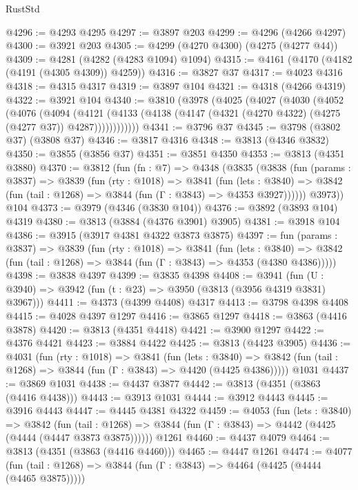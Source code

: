 \begin{lexlean}{RustStd}
\begin{coremodule}
{\begin{coremodule}
{{{{{{{{{{{{{{{{{{{{{{{{{{{{{{{{{{{@4296 := @4293 @4295
@4297 := @3897 @203
@4299 := @4296 (@4266 @4297)
@4300 := @3921 @203
@4305 := @4299 (@4270 @4300) (@4275 (@4277 @44))
@4309 := @4281 (@4282 (@4283 @1094) @1094)
@4315 := @4161 (@4170 (@4182 (@4191 (@4305 @4309)) @4259))
@4316 := @3827 @37
@4317 := @4023 @4316
@4318 := @4315 @4317
@4319 := @3897 @104
@4321 := @4318 (@4266 @4319)
@4322 := @3921 @104
@4340 := @3810
    (@3978
      (@4025
        (@4027
          (@4030
            (@4052
              (@4076
                (@4094
                  (@4121
                    (@4133 (@4138 (@4147 (@4321 (@4270 @4322) (@4275 (@4277 @37)) @4287))))))))))))
@4341 := @3796 @37
@4345 := @3798 (@3802 @37) (@3808 @37)
@4346 := @3817 @4316
@4348 := @3813 (@4346 @3832)
@4350 := @3855 (@3856 @37)
@4351 := @3851 @4350
@4353 := @3813 (@4351 @3880)
@4370 := @3812
    (fun (fn : @7) =>
    @4348
      (@3835
        (@3838
          (fun (params : @3837) =>
          @3839
            (fun (rty : @1018) =>
            @3841
              (fun (lets : @3840) =>
              @3842 (fun (tail : @1268) => @3844 (fun (Γ : @3843) => @4353 @3927))))))
        @3973))
    @104
@4373 := @3979 (@4346 (@3830 @104))
@4376 := @3892 (@3893 @104) @4319
@4380 := @3813 (@3884 (@4376 @3901) @3905)
@4381 := @3918 @104
@4386 := @3915 (@3917 @4381 @4322 @3873 @3875)
@4397 := fun (params : @3837) =>
  @3839
    (fun (rty : @1018) =>
    @3841
      (fun (lets : @3840) =>
      @3842 (fun (tail : @1268) => @3844 (fun (Γ : @3843) => @4353 (@4380 @4386)))))
@4398 := @3838 @4397
@4399 := @3835 @4398
@4408 := @3941 (fun (U : @3940) => @3942 (fun (t : @23) => @3950 (@3813 (@3956 @4319 @3831) @3967)))
@4411 := @4373 (@4399 @4408) @4317
@4413 := @3798 @4398 @4408
@4415 := @4028 @4397 @1297
@4416 := @3865 @1297
@4418 := @3863 (@4416 @3878)
@4420 := @3813 (@4351 @4418)
@4421 := @3900 @1297
@4422 := @4376 @4421
@4423 := @3884 @4422
@4425 := @3813 (@4423 @3905)
@4436 := @4031
    (fun (rty : @1018) =>
    @3841
      (fun (lets : @3840) =>
      @3842 (fun (tail : @1268) => @3844 (fun (Γ : @3843) => @4420 (@4425 @4386)))))
    @1031
@4437 := @3869 @1031
@4438 := @4437 @3877
@4442 := @3813 (@4351 (@3863 (@4416 @4438)))
@4443 := @3913 @1031
@4444 := @3912 @4443
@4445 := @3916 @4443
@4447 := @4445 @4381 @4322
@4459 := @4053
    (fun (lets : @3840) =>
    @3842
      (fun (tail : @1268) => @3844 (fun (Γ : @3843) => @4442 (@4425 (@4444 (@4447 @3873 @3875))))))
    @1261
@4460 := @4437 @4079
@4464 := @3813 (@4351 (@3863 (@4416 @4460)))
@4465 := @4447 @1261
@4474 := @4077
    (fun (tail : @1268) => @3844 (fun (Γ : @3843) => @4464 (@4425 (@4444 (@4465 @3875)))))
}}}}}}}}}}}}}}}}}}}}}}}}}}}}}}}}}}}
\end{coremodule}}
\end{coremodule}
\end{lexlean}
